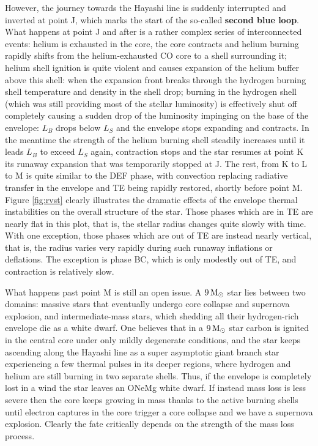 \documentclass[a4paper,10pt]{article}
\begin{document}
{\noindent}However, the journey towards the Hayashi line is suddenly interrupted and inverted at point J, which marks the start of the so-called \textbf{second blue loop}. What happens at point J and after is a rather complex series of interconnected events: helium is exhausted in the core, the core contracts and helium burning rapidly shifts from the helium-exhausted CO core to a shell surrounding it; helium shell ignition is quite violent and causes expansion of the helium buffer above this shell: when the expansion front breaks through the hydrogen burning shell temperature and density in the shell drop; burning in the hydrogen shell (which was still providing most of the stellar luminosity) is effectively shut off completely causing a sudden drop of the luminosity impinging on the base of the envelope: $L_B$ drops below $L_S$ and the envelope stops expanding and contracts. In the meantime the strength of the helium burning shell steadily increases until it leads $L_B$ to exceed $L_S$ again, contraction stops and the star resumes at point K its runaway expansion that was temporarily stopped at J. The rest, from K to L to M is quite similar to the DEF phase, with convection replacing radiative transfer in the envelope and TE being rapidly restored, shortly before point M. Figure \ref{fig:rvst} clearly illustrates the dramatic effects of the envelope thermal instabilities on the overall structure of the star. Those phases which are in TE are nearly flat in this plot, that is, the stellar radius changes quite slowly with time. With one exception, those phases which are out of TE are instead nearly vertical, that is, the radius varies very rapidly during such runaway inflations or deflations. The exception is phase BC, which is only modestly out of TE, and contraction is relatively slow.

{\noindent}What happens past point M is still an open issue. A $9\,{\rm M_\odot}$ star lies between two domains: massive stars that eventually undergo core collapse and supernova explosion, and intermediate-mass stars, which shedding all their hydrogen-rich envelope die as a white dwarf. One believes that in a $9\,{\rm M_\odot}$ star carbon is ignited in the central core under only mildly degenerate conditions, and the star keeps ascending along the Hayashi line as a super asymptotic giant branch star experiencing a few thermal pulses in its deeper regions, where hydrogen and helium are still burning in two separate shells. Thus, if the envelope is completely lost in a wind the star leaves an ONeMg white dwarf. If instead mass loss is less severe then the core keeps growing in mass thanks to the active burning shells until electron captures in the core trigger a core collapse and we have a supernova explosion. Clearly the fate critically depends on the strength of the mass loss process.
\end{document}
